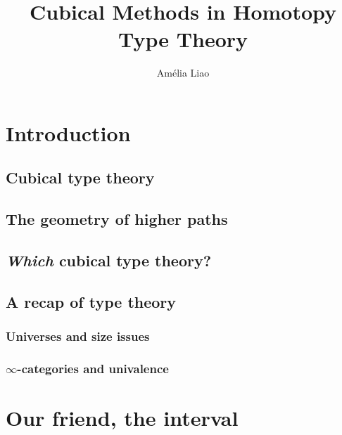 \title{Cubical Methods in Homotopy Type Theory}
\author{Am\'elia Liao}




\frontmatter
\thetitlepage
\tableofcontents

\mainmatter


\chapter{Introduction}


\section{Cubical type theory}


\section{The geometry of higher paths}


\section{\emph{Which} cubical type theory?}


\section{A recap of type theory}


\subsection{Universes and size issues}


\subsection{\texorpdfstring{\(\infty\)}{Infinity}-categories and univalence}


\chapter{Our friend, the interval}


\backmatter
\printbibliography


